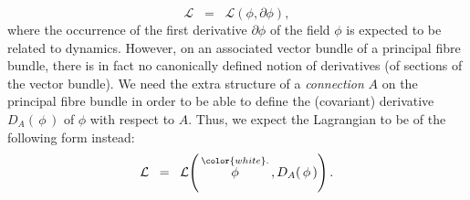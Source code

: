 \begin{itemize}
	\begin{equation*}
	\mathcal{L} \;\; = \;\; \mathcal{L}(\phi,\partial\phi),
	\end{equation*}
	where the occurrence of the first derivative $\partial\phi$ of the field $\phi$ is expected to be related to dynamics.
	\vskip 0.1cm
	However, on an associated vector bundle of a principal fibre bundle, there is in fact no canonically defined notion
	of derivatives (of sections of the vector bundle).
	We need the extra structure of a \textit{connection} $A$ on the principal fibre bundle
	in order to be able to define the (covariant) derivative $D_{A}(\,\phi\,)$ of $\phi$ with respect to $A$.
	Thus, we expect the Lagrangian to be of the following form instead:
	\begin{equation*}
	\mathcal{L} \;\; = \;\; \mathcal{L}\!\left(\,\overset{{\color{white}.}}{\phi}\,,D_{A}(\,\phi\,)\right).
	\end{equation*}
\end{itemize}


